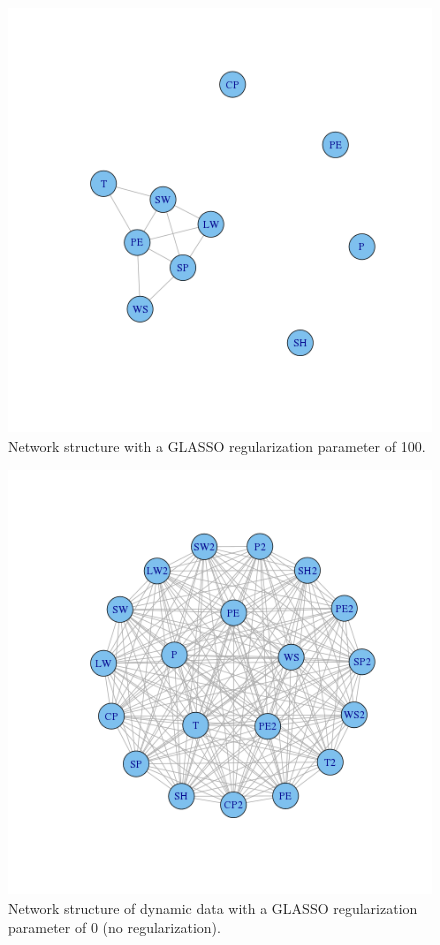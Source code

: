 \documentclass{article}
\begin{document}
\begin{figure}
\includegraphics[bb=0 0 2500 2500,scale=\textwidth]{images/data_100.png}
\caption{Network structure with a GLASSO regularization parameter of 100.}
\label{fig:data_100}
\end{figure}

\begin{figure}
\includegraphics[bb=0 0 2500 2500,scale=\textwidth]{images/dynamic_0.png}
\caption{Network structure of dynamic data with a GLASSO regularization parameter of 0 (no regularization).}
\label{fig:dynamic_0}
\end{figure}
\end{document}
